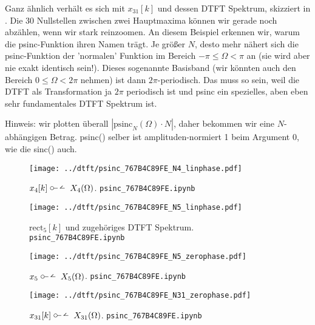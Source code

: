 \begin{Loesung}
Ganz ähnlich verhält es sich mit $x_{31}[k]$ und dessen DTFT Spektrum, skizziert
in . Die 30 Nullstellen zwischen
zwei Hauptmaxima können wir gerade noch abzählen, wenn wir stark reinzoomen.
An diesem Beispiel erkennen wir, warum die psinc-Funktion ihren Namen trägt.
Je größer $N$, desto mehr nähert sich die psinc-Funktion der 'normalen'
Funktion im Bereich $-\pi\leq\Omega<\pi$ an (sie wird aber nie exakt identisch sein!).
Dieses sogenannte Basisband (wir könnten auch den Bereich $0\leq\Omega<2\pi$ nehmen)
ist dann $2\pi$-periodisch. Das muss so sein, weil die DTFT als Transformation
ja $2\pi$ periodisch ist und psinc ein spezielles, aben eben sehr fundamentales DTFT
Spektrum ist.

Hinweis: wir plotten überall $|\mathrm{psinc}_N(\Omega)\cdot N|$, daher bekommen wir
eine $N$-abhängigen Betrag. psinc() selber ist amplituden-normiert 1 beim Argument 0, wie die sinc() auch.

\end{Loesung}
%
\begin{figure}
\centering
\texttt{[image: ../dtft/psinc\_767B4C89FE\_N4\_linphase.pdf]}
\caption{$x_4[k]\dtft X_4(\Omega)$.
\texttt{psinc\_767B4C89FE.ipynb}}
\label{fig:psinc_767B4C89FE_N4_linphase}
\end{figure}
%
\begin{figure}
\centering
\texttt{[image: ../dtft/psinc\_767B4C89FE\_N5\_linphase.pdf]}
\caption{$\mathrm{rect}_5[k]$ und zugehöriges DTFT Spektrum.
\texttt{psinc\_767B4C89FE.ipynb}}
\label{fig:psinc_767B4C89FE_N5_linphase}
\end{figure}
%
\begin{figure}
\centering
\texttt{[image: ../dtft/psinc\_767B4C89FE\_N5\_zerophase.pdf]}
\caption{$x_5 \dtft X_5(\Omega)$.
\texttt{psinc\_767B4C89FE.ipynb}}
\label{fig:psinc_767B4C89FE_N5_zerophase}
\end{figure}
%
\begin{figure}
\centering
\texttt{[image: ../dtft/psinc\_767B4C89FE\_N31\_zerophase.pdf]}
\caption{$x_{31}[k]\dtft X_{31}(\Omega)$.
\texttt{psinc\_767B4C89FE.ipynb}}
\label{fig:psinc_767B4C89FE_N31_zerophase}
\end{figure}




\clearpage
